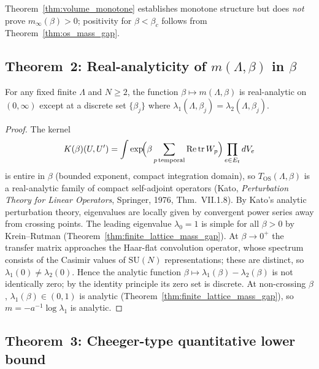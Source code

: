 \begin{remark}
Theorem~\ref{thm:volume_monotone} establishes monotone structure but does
\emph{not} prove $m_\infty(\beta)>0$; positivity for $\beta<\beta_c$
follows from Theorem~\ref{thm:os_mass_gap}.
\end{remark}
\subsection{Theorem~2: Real-analyticity of $m(\Lambda,\beta)$ in $\beta$}
\label{ssec:analyticity}

\begin{theorem}
\label{thm:analyticity}
For any fixed finite $\Lambda$ and $N\ge 2$, the function
$\beta\mapsto m(\Lambda,\beta)$ is real-analytic on $(0,\infty)$
except at a discrete set $\{\beta_j\}$ where
$\lambda_1(\Lambda,\beta_j)=\lambda_2(\Lambda,\beta_j)$.
\end{theorem}

\begin{proof}
The kernel
\[
  K(\beta)(U,U')=\int\exp\!\Bigl(\beta\sum_{p\,\text{temporal}}
  \operatorname{Re}\operatorname{tr}W_p\Bigr)\prod_{e\in E_t}dV_e
\]
is entire in $\beta$ (bounded exponent, compact integration domain), so
$T_{\mathrm{OS}}(\Lambda,\beta)$ is a real-analytic family of compact
self-adjoint operators (Kato, \emph{Perturbation Theory for Linear Operators},
Springer, 1976, Thm.~VII.1.8).
By Kato's analytic perturbation theory, eigenvalues are locally given by
convergent power series away from crossing points.
The leading eigenvalue $\lambda_0=1$ is simple for all $\beta>0$
by Krein--Rutman (Theorem~\ref{thm:finite_lattice_mass_gap}).
At $\beta\to 0^+$ the transfer matrix approaches the Haar-flat convolution
operator, whose spectrum consists of the Casimir values of $\mathrm{SU}(N)$
representations; these are distinct, so $\lambda_1(0)\ne\lambda_2(0)$.
Hence the analytic function $\beta\mapsto\lambda_1(\beta)-\lambda_2(\beta)$
is not identically zero; by the identity principle its zero set is discrete.
At non-crossing $\beta$, $\lambda_1(\beta)\in(0,1)$ is analytic
(Theorem~\ref{thm:finite_lattice_mass_gap}), so $m=-a^{-1}\log\lambda_1$
is analytic.
\end{proof}
\subsection{Theorem~3: Cheeger-type quantitative lower bound}
\label{ssec:cheeger}

